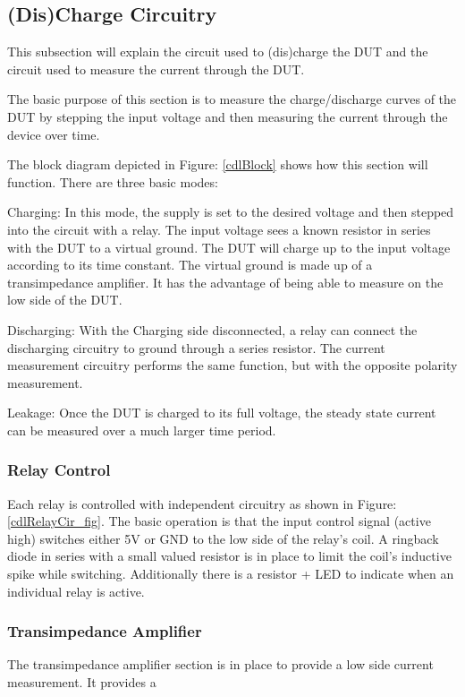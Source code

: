 \subsection {(Dis)Charge Circuitry}

This subsection will explain the circuit used to (dis)charge the DUT and the circuit used to measure the current through the DUT.

The basic purpose of this section is to measure the charge/discharge curves of the DUT by stepping the input voltage and then measuring the current through the device over time.



The block diagram depicted in Figure: \ref{cdlBlock} shows how this section will function. There are three basic modes:

Charging:
In this mode, the supply is set to the desired voltage and then stepped into the circuit with a relay. The input voltage sees a known resistor in series with the DUT to a virtual ground. The DUT will charge up to the input voltage according to its time constant. The virtual ground is made up of a transimpedance amplifier. It has the advantage of being able to measure on the low side of the DUT.

Discharging:
With the Charging side disconnected, a relay can connect the discharging circuitry to ground through a series resistor. The current measurement circuitry performs the same function, but with the opposite polarity measurement.

Leakage:
Once the DUT is charged to its full voltage, the steady state current can be measured over a much larger time period.

\subsubsection{Relay Control}

Each relay is controlled with independent circuitry as shown in Figure: \ref{cdlRelayCir_fig}. The basic operation is that the input control signal (active high) switches either 5V or GND to the low side of the relay's coil. A ringback diode in series with a small valued resistor is in place to limit the coil's inductive spike while switching. Additionally there is a resistor + LED to indicate when an individual relay is active.

\subsubsection{Transimpedance Amplifier}
The transimpedance amplifier section is in place to provide a low side current measurement. It provides a 


